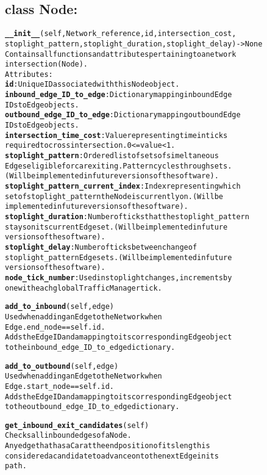 \subsection{class Node:}

\begin{alltt}
\textbf{__init__}(self, Network_reference, id, intersection_cost,
stoplight_pattern, stoplight_duration, stoplight_delay) -> None
Contains all functions and attributes pertaining to a network 
intersection (Node).
Attributes:
    \textbf{id}:  Unique ID associated with this Node object.
    \textbf{inbound_edge_ID_to_edge}:  Dictionary mapping inbound Edge 
    IDs to Edge objects.
    \textbf{outbound_edge_ID_to_edge}:  Dictionary mapping outbound Edge 
    IDs to Edge objects.
    \textbf{intersection_time_cost}:  Value representing time in ticks 
    required to cross intersection.  0 <= value < 1.
    \textbf{stoplight_pattern}:  Ordered list of sets of simeltaneous 
    Edges eligible for car exiting. Pattern cycles through sets. 
    (Will be implemented in future versions of the software).
    \textbf{stoplight_pattern_current_index}:  Index representing which 
    set of stoplight_pattern the Node is currently on.  (Will be
    implemented in future versions of the software).
    \textbf{stoplight_duration}: Number of ticks that the stoplight_pattern 
    stays on its current Edge set. (Will be implemented in future 
    versions of the software).
    \textbf{stoplight_delay}: Number of ticks between change of 
    stoplight_pattern Edge sets. (Will be implemented in future 
    versions of the software).
    \textbf{node_tick_number}:  Used in stoplight changes, increments by 
    one with each global TrafficManager tick. 

\textbf{add_to_inbound}(self, edge)
Used when adding an Edge to the Network when 
Edge.end_node == self.id .
Adds the Edge ID and a mapping to its corresponding Edge object 
to the inbound_edge_ID_to_edge dictionary.

\textbf{add_to_outbound}(self, edge)
Used when adding an Edge to the Network when 
Edge.start_node == self.id .
Adds the Edge ID and a mapping to its corresponding Edge object 
to the outbound_edge_ID_to_edge dictionary.

\textbf{get_inbound_exit_candidates}(self)
Checks all inbound edges of a Node.  
Any edge that has a Car at the end position of its length is 
considered a candidate to advance on to the next Edge in its 
path.


\end{alltt}

